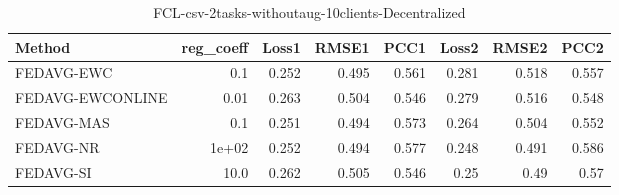 \begin{table}
\caption{FCL-csv-2tasks-withoutaug-10clients-Decentralized}
\begin{tabular}{lrrrrrrr}
\toprule
Method & reg_coeff & Loss1 & RMSE1 & PCC1 & Loss2 & RMSE2 & PCC2 \\
\midrule
FEDAVG-EWC & 0.1 & 0.252 & 0.495 & 0.561 & 0.281 & 0.518 & 0.557 \\
FEDAVG-EWCONLINE & 0.01 & 0.263 & 0.504 & 0.546 & 0.279 & 0.516 & 0.548 \\
FEDAVG-MAS & 0.1 & 0.251 & 0.494 & 0.573 & 0.264 & 0.504 & 0.552 \\
FEDAVG-NR & 1e+02 & 0.252 & 0.494 & 0.577 & 0.248 & 0.491 & 0.586 \\
FEDAVG-SI & 10.0 & 0.262 & 0.505 & 0.546 & 0.25 & 0.49 & 0.57 \\
\bottomrule
\end{tabular}
\end{table}
